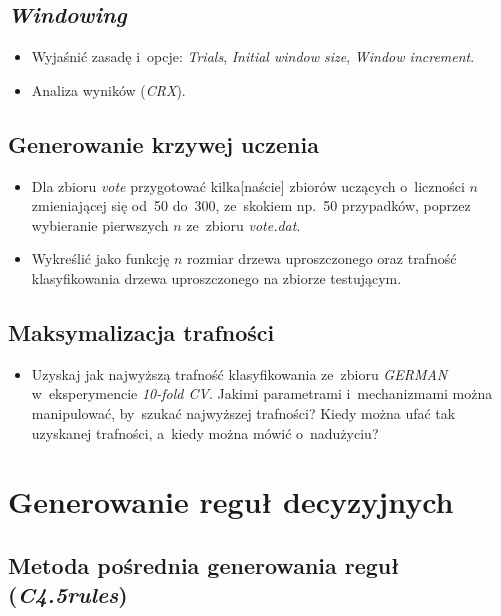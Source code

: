 \documentclass{article}
\begin{document}
\subsection{\emph{Windowing}}

\begin{itemize}
\item Wyjaśnić zasadę i~opcje: \emph{Trials}, \emph{Initial window size}, \emph{Window increment}.
\item Analiza wyników (\emph{CRX}).
\end{itemize}

\subsection{Generowanie krzywej uczenia}

\begin{itemize}
\item Dla zbioru \emph{vote} przygotować kilka[naście] zbiorów uczących o~liczności $n$ zmieniającej się od~50 do~300, ze~skokiem np.~50 przypadków, poprzez wybieranie pierwszych $n$ ze~zbioru \emph{vote.dat}.
\item Wykreślić jako funkcję $n$ rozmiar drzewa uproszczonego oraz trafność klasyfikowania drzewa uproszczonego na zbiorze testującym.

\end{itemize}

\subsection{Maksymalizacja trafności}

\begin{itemize}
\item Uzyskaj jak najwyższą trafność klasyfikowania ze~zbioru \emph{GERMAN} w~eksperymencie \emph{10-fold CV}. Jakimi parametrami i~mechanizmami można manipulować, by~szukać najwyższej trafności? Kiedy można ufać tak uzyskanej trafności, a~kiedy można mówić o~nadużyciu?
\end{itemize}


\section{Generowanie reguł decyzyjnych}

\subsection{Metoda pośrednia generowania reguł (\emph{C4.5rules})}
\end{document}
